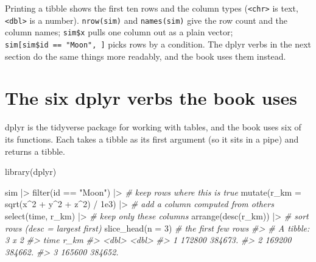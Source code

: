 \documentclass[
  10.5pt,
  letterpaper,
]{scrbook}
\newenvironment{Shaded}{\begin{snugshade}}{\end{snugshade}}
\newcommand{\AttributeTok}[1]{\textcolor[rgb]{0.00,0.00,0.00}{#1}}
\newcommand{\CommentTok}[1]{\textcolor[rgb]{0.00,0.00,0.00}{\textit{#1}}}
\newcommand{\DecValTok}[1]{\textcolor[rgb]{0.00,0.00,0.00}{#1}}
\newcommand{\FloatTok}[1]{\textcolor[rgb]{0.00,0.00,0.00}{#1}}
\newcommand{\FunctionTok}[1]{\textcolor[rgb]{0.00,0.00,0.00}{#1}}
\newcommand{\NormalTok}[1]{\textcolor[rgb]{0.00,0.00,0.00}{#1}}
\newcommand{\SpecialCharTok}[1]{\textcolor[rgb]{0.00,0.00,0.00}{#1}}
\newcommand{\StringTok}[1]{\textcolor[rgb]{0.00,0.00,0.00}{#1}}
\theoremstyle{definition}
\theoremstyle{plain}
\theoremstyle{remark}
\begin{document}
Printing a tibble shows the first ten rows and the column types
(\texttt{\textless{}chr\textgreater{}} is text,
\texttt{\textless{}dbl\textgreater{}} is a number). \texttt{nrow(sim)}
and \texttt{names(sim)} give the row count and the column names;
\texttt{sim\$x} pulls one column out as a plain vector;
\texttt{sim{[}sim\$id\ ==\ "Moon",\ {]}} picks rows by a condition. The
dplyr verbs in the next section do the same things more readably, and
the book uses them instead.

\section{The six dplyr verbs the book
uses}\label{the-six-dplyr-verbs-the-book-uses}

dplyr is the tidyverse package for working with tables, and the book
uses six of its functions. Each takes a tibble as its first argument (so
it sits in a pipe) and returns a tibble.

\begin{Shaded}
\begin{Highlighting}[]
\FunctionTok{library}\NormalTok{(dplyr)}

\NormalTok{sim }\SpecialCharTok{|\textgreater{}}
  \FunctionTok{filter}\NormalTok{(id }\SpecialCharTok{==} \StringTok{"Moon"}\NormalTok{) }\SpecialCharTok{|\textgreater{}}                      \CommentTok{\# keep rows where this is true}
  \FunctionTok{mutate}\NormalTok{(}\AttributeTok{r\_km =} \FunctionTok{sqrt}\NormalTok{(x}\SpecialCharTok{\^{}}\DecValTok{2} \SpecialCharTok{+}\NormalTok{ y}\SpecialCharTok{\^{}}\DecValTok{2} \SpecialCharTok{+}\NormalTok{ z}\SpecialCharTok{\^{}}\DecValTok{2}\NormalTok{) }\SpecialCharTok{/} \FloatTok{1e3}\NormalTok{) }\SpecialCharTok{|\textgreater{}} \CommentTok{\# add a column computed from others}
  \FunctionTok{select}\NormalTok{(time, r\_km) }\SpecialCharTok{|\textgreater{}}                        \CommentTok{\# keep only these columns}
  \FunctionTok{arrange}\NormalTok{(}\FunctionTok{desc}\NormalTok{(r\_km)) }\SpecialCharTok{|\textgreater{}}                       \CommentTok{\# sort rows (desc = largest first)}
  \FunctionTok{slice\_head}\NormalTok{(}\AttributeTok{n =} \DecValTok{3}\NormalTok{)                            }\CommentTok{\# the first few rows}
\CommentTok{\#\textgreater{} \# A tibble: 3 x 2}
\CommentTok{\#\textgreater{}     time    r\_km}
\CommentTok{\#\textgreater{}    \textless{}dbl\textgreater{}   \textless{}dbl\textgreater{}}
\CommentTok{\#\textgreater{} 1 172800 384673.}
\CommentTok{\#\textgreater{} 2 169200 384662.}
\CommentTok{\#\textgreater{} 3 165600 384652.}
\end{Highlighting}
\end{Shaded}
\end{document}
